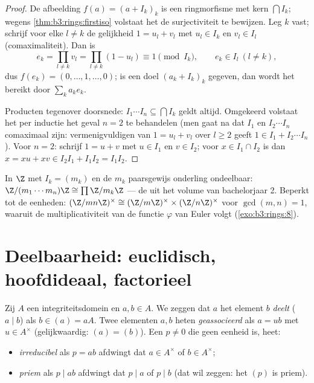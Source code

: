 \begin{proof}
De afbeelding $f(a) = (a + I_k)_k$ is een ringmorfisme met kern
$\bigcap I_k$; wegens \cref{thm:b3:rings:firstiso} volstaat het de
surjectiviteit te bewijzen. Leg $k$ vast; schrijf voor elke $l \neq
k$ de gelijkheid $1 = u_l + v_l$ met $u_l \in I_k$ en $v_l \in I_l$
(comaximaliteit). Dan is
\[
e_k = \prod_{l \neq k} v_l = \prod_{l\neq k}(1 - u_l)
\equiv 1 \pmod{I_k},
\qquad e_k \in I_l \ (l \neq k),
\]
dus $f(e_k) = (0, \dots, 1, \dots, 0)$; is een doel $(a_k + I_k)_k$
gegeven, dan wordt het bereikt door $\sum_k a_k e_k$.

Producten tegenover doorsnede: $I_1\cdots I_n \subseteq \bigcap
I_k$ geldt altijd. Omgekeerd volstaat het per inductie het geval $n
= 2$ te behandelen (men gaat na dat $I_1$ en $I_2\cdots I_n$
comaximaal zijn: vermenigvuldigen van $1 = u_l + v_l$ over $l \geq
2$ geeft $1 \in I_1 + I_2\cdots I_n$). Voor $n = 2$: schrijf $1 = u
+ v$ met $u \in I_1$ en $v \in I_2$; voor $x \in I_1 \cap I_2$ is
dan $x = xu + xv \in I_2I_1 + I_1I_2 = I_1I_2$.
\end{proof}

\begin{example}\label{ex:b3:rings:crtz}
In $\Z$ met $I_k = (m_k)$ en de $m_k$ paarsgewijs onderling
ondeelbaar: $\Z/(m_1\cdots m_n)\Z \cong \prod \Z/m_k\Z$ --- de
 uit het volume van bachelorjaar 2. Beperkt tot
de eenheden: $(\Z/mn\Z)^\times \cong (\Z/m\Z)^\times \times
(\Z/n\Z)^\times$ voor $\gcd(m,n)=1$, waaruit de multiplicativiteit
van de functie $\varphi$ van Euler volgt (\cref{exo:b3:rings:8}).
\end{example}

\section{Deelbaarheid: euclidisch, hoofdideaal, factorieel}

\begin{definition}\label{def:b3:rings:divisibility}
Zij $A$ een integriteitsdomein en $a, b \in A$. We zeggen dat $a$
het element $b$ \emph{deelt} ($a \mid b$) als $b \in (a) = aA$. Twee
elementen $a, b$ heten \emph{geassocieerd} als $a = ub$ met $u \in A^\times$ (gelijkwaardig: $(a) =
(b)$). Een $p \neq 0$ die geen eenheid is, heet:
\begin{itemize}
  \item \emph{irreducibel} als $p = ab$
        afdwingt dat $a \in A^\times$ of $b \in A^\times$;
  \item \emph{priem} als $p \mid ab$ afdwingt
        dat $p \mid a$ of $p \mid b$ (dat wil zeggen: het 
        $(p)$ is priem).
\end{itemize}
\end{definition}


